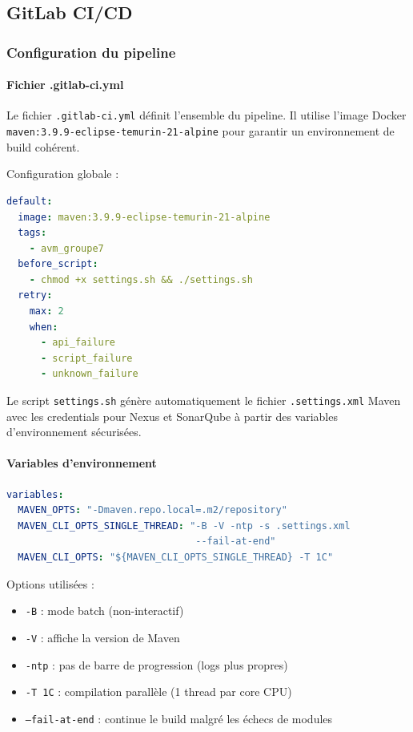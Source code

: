 \subsection{GitLab CI/CD}

\subsubsection{Configuration du pipeline}

\paragraph{Fichier .gitlab-ci.yml}

Le fichier \texttt{.gitlab-ci.yml} définit l'ensemble du pipeline. Il utilise l'image Docker \texttt{maven:3.9.9-eclipse-temurin-21-alpine} pour garantir un environnement de build cohérent.

Configuration globale :
\vspace{0.3cm}
\begin{lstlisting}[language=yaml, caption=Configuration globale GitLab CI]
default:
  image: maven:3.9.9-eclipse-temurin-21-alpine
  tags:
    - avm_groupe7
  before_script:
    - chmod +x settings.sh && ./settings.sh
  retry:
    max: 2
    when:
      - api_failure
      - script_failure
      - unknown_failure
\end{lstlisting}

Le script \texttt{settings.sh} génère automatiquement le fichier \texttt{.settings.xml} Maven avec les credentials pour Nexus et SonarQube à partir des variables d'environnement sécurisées.

\paragraph{Variables d'environnement}

\vspace{0.3cm}
\begin{lstlisting}[language=yaml, caption=Variables Maven]
variables:
  MAVEN_OPTS: "-Dmaven.repo.local=.m2/repository"
  MAVEN_CLI_OPTS_SINGLE_THREAD: "-B -V -ntp -s .settings.xml
                                 --fail-at-end"
  MAVEN_CLI_OPTS: "${MAVEN_CLI_OPTS_SINGLE_THREAD} -T 1C"
\end{lstlisting}

Options utilisées :
\begin{itemize}
    \item \texttt{-B} : mode batch (non-interactif)
    \item \texttt{-V} : affiche la version de Maven
    \item \texttt{-ntp} : pas de barre de progression (logs plus propres)
    \item \texttt{-T 1C} : compilation parallèle (1 thread par core CPU)
    \item \texttt{--fail-at-end} : continue le build malgré les échecs de modules
\end{itemize}

